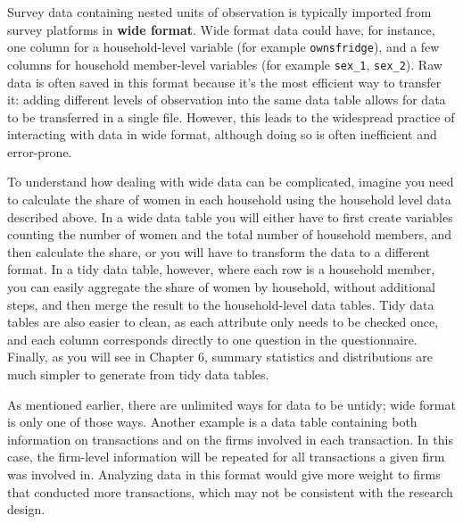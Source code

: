 Survey data containing nested units of observation is typically
imported from survey platforms in \textbf{wide format}.
Wide format data could have, for instance,
one column for a household-level variable (for example \texttt{ownsfridge}),
and a few columns for household member-level variables (for example \texttt{sex\_1}, \texttt{sex\_2}).
Raw data is often saved in this format because it's the most efficient way to transfer it:
adding different levels of observation into the same data table
allows for data to be transferred in a single file.
However, this leads to the widespread practice of interacting with data in wide format,
although doing so is often inefficient and error-prone.

To understand how dealing with wide data can be complicated,
imagine you need to calculate the share of women
in each household using the household level data described above.
In a wide data table you will either have to first create variables counting
the number of women and the total number of household members,
and then calculate the share,
or you will have to transform the data to a different format.
In a tidy data table, however, where each row is a household member,
you can easily aggregate the share of women by household,
without additional steps,
and then merge the result to the household-level data tables.
Tidy data tables are also easier to clean,
as each attribute only needs to be checked once,
and each column corresponds directly to one question in the questionnaire.
Finally, as you will see in Chapter 6,
summary statistics and distributions are much simpler
to generate from tidy data tables.

As mentioned earlier, there are unlimited ways for data to be untidy;
wide format is only one of those ways.
Another example is a data table containing both information on transactions
and on the firms involved in each transaction.
In this case, the firm-level information will be repeated
for all transactions a given firm was involved in.
Analyzing data in this format would give more weight
to firms that conducted more transactions,
which may not be consistent with the research design.

